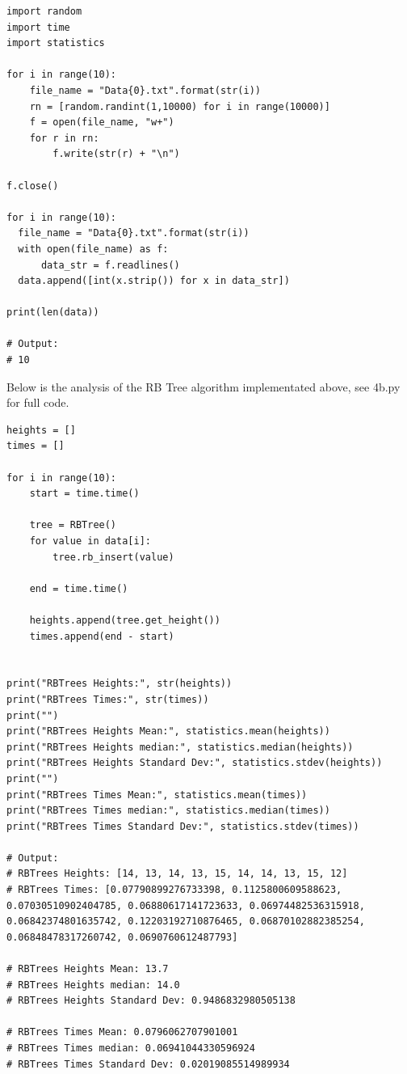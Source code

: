 \documentclass{article}
\begin{document}
\begin{enumerate}
\begin{enumerate}
      \begin{lstlisting}
import random
import time
import statistics

for i in range(10):
    file_name = "Data{0}.txt".format(str(i))
    rn = [random.randint(1,10000) for i in range(10000)]
    f = open(file_name, "w+")
    for r in rn: 
        f.write(str(r) + "\n")

f.close()

for i in range(10):
  file_name = "Data{0}.txt".format(str(i))
  with open(file_name) as f:
      data_str = f.readlines()
  data.append([int(x.strip()) for x in data_str])

print(len(data))

# Output:
# 10
      \end{lstlisting}

      Below is the analysis of the RB Tree algorithm implementated above, see 4b.py for full code. 

      \begin{lstlisting}
heights = []
times = []

for i in range(10):
    start = time.time()
    
    tree = RBTree()
    for value in data[i]:
        tree.rb_insert(value)
    
    end = time.time()
    
    heights.append(tree.get_height())
    times.append(end - start)

    
print("RBTrees Heights:", str(heights))
print("RBTrees Times:", str(times))
print("")
print("RBTrees Heights Mean:", statistics.mean(heights))
print("RBTrees Heights median:", statistics.median(heights))
print("RBTrees Heights Standard Dev:", statistics.stdev(heights))
print("")
print("RBTrees Times Mean:", statistics.mean(times))
print("RBTrees Times median:", statistics.median(times))
print("RBTrees Times Standard Dev:", statistics.stdev(times))

# Output:
# RBTrees Heights: [14, 13, 14, 13, 15, 14, 14, 13, 15, 12]
# RBTrees Times: [0.07790899276733398, 0.1125800609588623, 0.07030510902404785, 0.06880617141723633, 0.06974482536315918, 0.06842374801635742, 0.12203192710876465, 0.06870102882385254, 0.06848478317260742, 0.0690760612487793]

# RBTrees Heights Mean: 13.7
# RBTrees Heights median: 14.0
# RBTrees Heights Standard Dev: 0.9486832980505138

# RBTrees Times Mean: 0.0796062707901001
# RBTrees Times median: 0.06941044330596924
# RBTrees Times Standard Dev: 0.02019085514989934
      \end{lstlisting}


\end{enumerate}
\end{enumerate}
\end{document}
